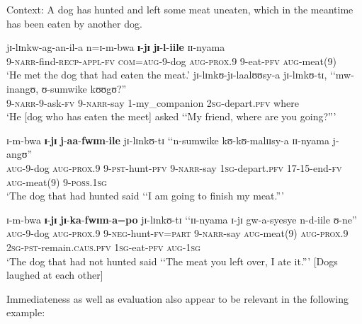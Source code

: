 \begin{exe}
\ex \label{exRelPFVDogs1}Context: A dog has hunted and left some meat uneaten, which in the meantime has been eaten by another dog.
\begin{xlist}
\ex 
\label{exRelPFVDogs1sentence1}
\gll jɪ-lɪnkw-ag-an-il-a n=ɪ-m-bwa \textbf{ɪ}-\textbf{jɪ} \textbf{jɪ}-\textbf{l}-\textbf{iile} ɪɪ-nyama\\
9-\textsc{narr}-find-\textsc{recp}-\textsc{appl}-\textsc{fv} \textsc{com}=\textsc{aug}-9-dog \textsc{aug}-\textsc{prox.9} 9-eat-\textsc{pfv} \textsc{aug}-meat(9)\\
\glt \lq He met the dog that had eaten the meat.'
\ex\gll jɪ-lɪnkʊ-jɪ-laalʊʊsy-a jɪ-lɪnkʊ-tɪ, \textup{\lq\lq}mw-inangʊ, ʊ-sumwike kʊʊgʊ?\textup{''}\\
9-\textsc{narr}-9-ask-\textsc{fv} 9-\textsc{narr}-say \phantom{\lq\lq}1-my\_companion \textsc{2sg}-depart.\textsc{pfv} where\\
\glt \lq He [dog who has eaten the meet] asked \lq\lq My friend, where are you going?''{}'

\ex\label{exRelPFVDogs1sentence3}
\gll ɪ-m-bwa \textbf{ɪ}-\textbf{jɪ} \textbf{j}-\textbf{aa}-\textbf{fwɪm}-\textbf{ile} jɪ-lɪnkʊ-tɪ \textup{\lq\lq}n-sumwike kʊ-kʊ-malɪɪsy-a ɪɪ-nyama j-angʊ\textup{''}\\
\textsc{aug}-9-dog \textsc{aug}-\textsc{prox.9} 9-\textsc{pst}-hunt-\textsc{pfv} 9-\textsc{narr}-say \phantom{\lq\lq}\textsc{1sg}-depart.\textsc{pfv} 17-15-end-\textsc{fv} \textsc{aug}-meat(9) 9-\textsc{poss.1sg}\\
\glt \lq The dog that had hunted said \lq\lq I am going to finish my meat.''{}'

\ex \label{exRelPFVDogs1sentence4}
\gll ɪ-m-bwa \textbf{ɪ}-\textbf{jɪ} \textbf{jɪ}-\textbf{ka}-\textbf{fwɪm}-\textbf{a}=\textbf{po} jɪ-lɪnkʊ-tɪ \textup{\lq\lq}ɪɪ-nyama ɪ-jɪ gw-a-syesye n-d-iile ʊ-ne\textup{''}\\
\textsc{aug}-9-dog \textsc{aug}-\textsc{prox.9} 9-\textsc{neg}-hunt-\textsc{fv}=\textsc{part} 9-\textsc{narr}-say \phantom{\lq\lq}\textsc{aug}-meat(9) \textsc{aug}-\textsc{prox.9} \textsc{2sg}-\textsc{pst}-remain.\textsc{caus.pfv} \textsc{1sg}-eat-\textsc{pfv} \textsc{aug}-\textsc{1sg}\\
\glt \lq The dog that had not hunted said \lq\lq The meat you left over, I ate it.''{}' [Dogs laughed at each other]
\end{xlist}
\end{exe}

Immediateness as well as evaluation also appear to be relevant in the following example:%

